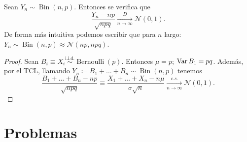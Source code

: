 \begin{corolario}
Sean $Y_n \sim \operatorname{Bin}(n, p)$. Entonces se verifica que
\[
  \frac{Y_n - np}{\sqrt{npq}} \xrightarrow[n\to\infty]{D} \mathcal{N}(0, 1).
\]
De forma más intuitiva podemos escribir que para $n$ largo: $Y_n \sim \operatorname{Bin}(n, p) \approx \mathcal{N}(np, npq)$.
\end{corolario}

\begin{proof}
Sean $B_i \equiv X_i \stackrel{\text{i.i.d.}}{\sim} \operatorname{Bernoulli}(p)$. Entonces $\mu = p$; $\operatorname{Var} B_1 = pq$. Además, por el TCL, llamando $Y_n \coloneqq B_1 + \dots + B_n \sim \operatorname{Bin}(n, p)$ tenemos
\[
  \frac{B_1 + \dots + B_n - np}{\sqrt{npq}} \equiv \frac{X_1 + \dots + X_n - n\mu}{\sigma\sqrt{n}} \xrightarrow[n\to\infty]{c.s.} \mathcal{N}(0, 1).
\]
\end{proof}

\section{Problemas}

